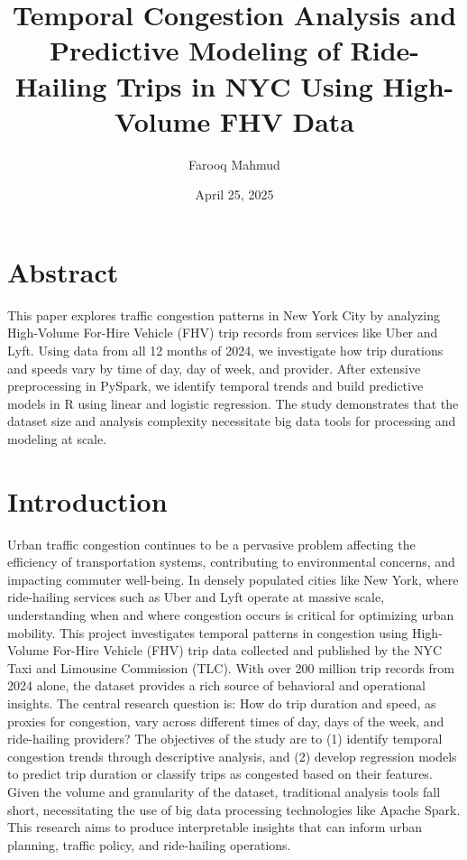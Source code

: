 \documentclass{article}
\title{\vspace{-2cm}Temporal Congestion Analysis and Predictive Modeling of Ride-Hailing Trips in NYC Using High-Volume FHV Data}
\author{Farooq Mahmud}
\date{April 25, 2025}
\begin{document}
\maketitle

\section{Abstract}
This paper explores traffic congestion patterns in New York City by analyzing High-Volume For-Hire Vehicle (FHV) trip records from services like Uber and Lyft. Using data from all 12 months of 2024, we investigate how trip durations and speeds vary by time of day, day of week, and provider. After extensive preprocessing in PySpark, we identify temporal trends and build predictive models in R using linear and logistic regression. The study demonstrates that the dataset size and analysis complexity necessitate big data tools for processing and modeling at scale.


\section{Introduction}
Urban traffic congestion continues to be a pervasive problem affecting the efficiency of transportation systems, contributing to environmental concerns, and impacting commuter well-being. In densely populated cities like New York, where ride-hailing services such as Uber and Lyft operate at massive scale, understanding when and where congestion occurs is critical for optimizing urban mobility.
This project investigates temporal patterns in congestion using High-Volume For-Hire Vehicle (FHV) trip data collected and published by the NYC Taxi and Limousine Commission (TLC). With over 200 million trip records from 2024 alone, the dataset provides a rich source of behavioral and operational insights. The central research question is: How do trip duration and speed, as proxies for congestion, vary across different times of day, days of the week, and ride-hailing providers?
The objectives of the study are to (1) identify temporal congestion trends through descriptive analysis, and (2) develop regression models to predict trip duration or classify trips as congested based on their features. Given the volume and granularity of the dataset, traditional analysis tools fall short, necessitating the use of big data processing technologies like Apache Spark. This research aims to produce interpretable insights that can inform urban planning, traffic policy, and ride-hailing operations.
\end{document}
